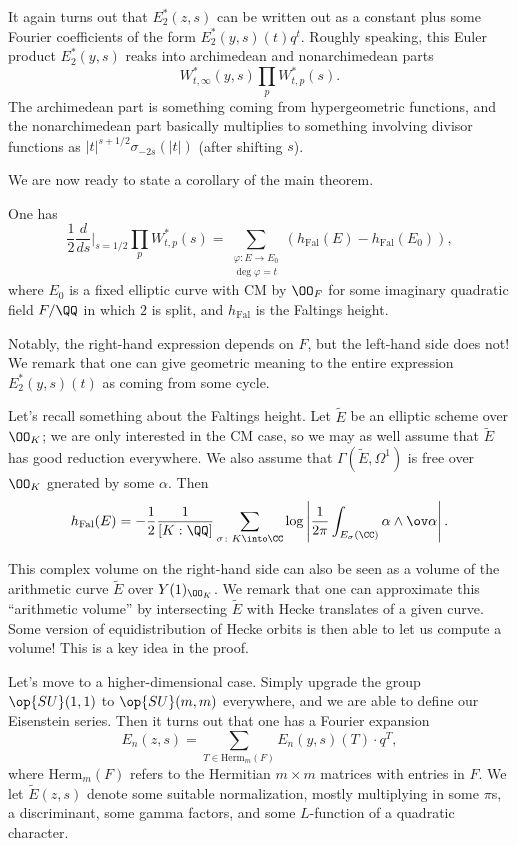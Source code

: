 \documentclass{article}
\begin{document}
It again turns out that $E_2^*(z,s)$ can be written out as a constant plus some Fourier coef\-fi\-cients of the form $E^*_2(y,s)(t)q^t$. Roughly speaking, this Euler product $E^*_2(y,s)$ reaks into archimedean and nonarchimedean parts
\[W^*_{t,\infty}(y,s)\prod_pW^*_{t,p}(s).\]
The archimedean part is something coming from hypergeometric functions, and the nonarchimedean part basically multiplies to something involving divisor functions as $\left|t\right|^{s+1/2}\sigma_{-2s}(\left|t\right|)$ (after shifting $s$).

We are now ready to state a corollary of the main theorem.
\begin{corollary}
	One has
	\[\frac12\frac d{ds}\bigg|_{s=1/2}\prod_pW_{t,p}^*(s)=\sum_{\substack{\varphi\colon E\to E_0\\\deg\varphi=t}}(h_{\mathrm{Fal}}(E)-h_{\mathrm{Fal}}(E_0)),\]
	where $E_0$ is a fixed elliptic curve with CM by $\OO_F$ for some imaginary quadratic field $F/\QQ$ in which $2$ is split, and $h_{\mathrm{Fal}}$ is the Faltings height.
\end{corollary}
Notably, the right-hand expression depends on $F$, but the left-hand side does not! We remark that one can give geometric meaning to the entire expression $E_2^*(y,s)(t)$ as coming from some cycle.
\begin{remark}
	Let's recall something about the Faltings height. Let $\widetilde E$ be an elliptic scheme over $\OO_K$; we are only interested in the CM case, so we may as well assume that $\widetilde E$ has good reduction everywhere. We also assume that $\Gamma(\widetilde E,\Omega^1)$ is free over $\OO_K$ gnerated by some $\alpha$. Then
	\[h_{\mathrm{Fal}}(E)=-\frac12\frac1{[K:\QQ]}\sum_{\sigma\colon K\into\CC}\log\left|\frac1{2\pi}\int_{E_\sigma(\CC)}\alpha\land\ov\alpha\right|.\]
\end{remark}
\begin{remark}
	This complex volume on the right-hand side can also be seen as a volume of the arithmetic curve $\widetilde E$ over $Y(1)_{\OO_K}$. We remark that one can approximate this ``arithmetic volume'' by intersecting $\widetilde E$ with Hecke translates of a given curve. Some version of equidistribution of Hecke orbits is then able to let us compute a volume! This is a key idea in the proof.
\end{remark}
Let's move to a higher-dimensional case. Simply upgrade the group $\op{SU}(1,1)$ to $\op{SU}(m,m)$ everywhere, and we are able to define our Eisenstein series. Then it turns out that one has a Fourier expansion
\[E_n(z,s)=\sum_{T\in\mathrm{Herm}_m(F)}E_n(y,s)(T)\cdot q^T,\]
where $\mathrm{Herm}_m(F)$ refers to the Hermitian $m\times m$ matrices with entries in $F$. We let $\widetilde E(z,s)$ denote some suitable normalization, mostly multiplying in some $\pi$s, a discriminant, some gamma factors, and some $L$-function of a quadratic character.
\end{document}
